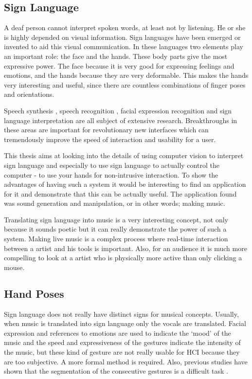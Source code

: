 \subsection*{Sign Language}

A deaf person cannot interpret spoken words, at least not by listening. He or she is highly depended on visual information. Sign languages have been emerged or invented to aid this visual communication. In these languages two elements play an important role: the face and the hands. These body parts give the most expressive power. The face because it is very good for expressing feelings and emotions, and the hands because they are very deformable. This makes the hands very interesting and useful, since there are countless combinations of finger poses and orientations. 

Speech synthesis \citep{Hunt1996}, speech recognition \citep{rabiner1993}, facial expression recognition \citep{Cohen2003} and sign language interpretation \citep{Cooper2007} are all subject of extensive research. Breakthroughs in these areas are important for revolutionary new interfaces which can tremendously improve the speed of interaction and usability for a user. 



This thesis aims at looking into the details of using computer vision to interpret sign language and especially to use sign language to actually control the computer - to use your hands for non-intrusive interaction. To show the advantages of having such a system it would be interesting to find an application for it and demonstrate that this can be actually useful. The application found was sound generation and manipulation, or in other words; making music. 

Translating sign language into music is a very interesting concept, not only because it sounds poetic but it can really demonstrate the power of such a system. Making live music is a complex process where real-time interaction between a artist and his tools is important. Also, for an audience it is much more compelling to look at a artist who is physically more active than only clicking a mouse.

\subsection*{Hand Poses}
Sign language does not really have distinct signs for musical concepts. Usually, when music is translated into sign language only the vocals are translated. Facial expression and references to emotions are used to indicate the `mood' of the music and the speed and expressiveness of the gestures indicate the intensity of the music, but these kind of gesture are not really usable for HCI because they are too subjective. A more formal method is required. Also, previous studies have shown that the segmentation of the consecutive gestures is a difficult task \citep{Buehler2009,RichardBowden2004}.

